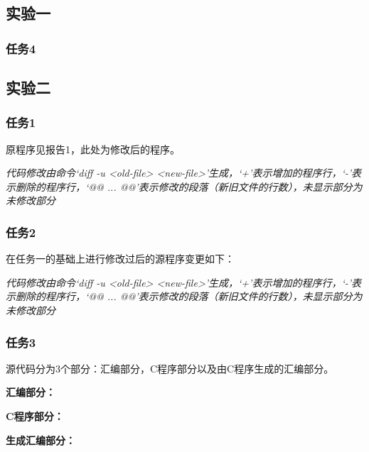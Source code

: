 \documentclass{article}
\newenvironment{codeFont}{\codeF}{\par}
\begin{document}
\subsection{实验一}
\subsubsection{任务4}
\label{code:1_4}
\begin{codeFont}
	
\end{codeFont}

\newpage
\subsection{实验二}
\subsubsection{任务1}
\label{code:2_1}
	原程序见报告1，此处为修改后的程序。 \par
	{\emph{代码修改由命令`diff -u <old-file> <new-file>'生成，`+'表示增加的程序行，`-'表示删除的程序行，`@@ ... @@'表示修改的段落（新旧文件的行数），未显示部分为未修改部分}}
	\begin{codeFont}
		
	\end{codeFont}
\newpage
\subsubsection{任务2}
\label{code:2_2}
	在任务一的基础上进行修改过后的源程序变更如下： \par
	{\emph{代码修改由命令`diff -u <old-file> <new-file>'生成，`+'表示增加的程序行，`-'表示删除的程序行，`@@ ... @@'表示修改的段落（新旧文件的行数），未显示部分为未修改部分}}
	\begin{codeFont}
		
	\end{codeFont}
\newpage
\subsubsection{任务3}
\label{code:2_3}
	源代码分为3个部分：汇编部分，C程序部分以及由C程序生成的汇编部分。\par
	{\textbf{汇编部分：}} \par
	\begin{codeFont}
		
	\end{codeFont}
	{\textbf{C程序部分：}} \par
	\begin{codeFont}
		
	\end{codeFont}
	{\textbf{生成汇编部分：}} \par
	\begin{codeFont}
		
	\end{codeFont}
\end{document}
